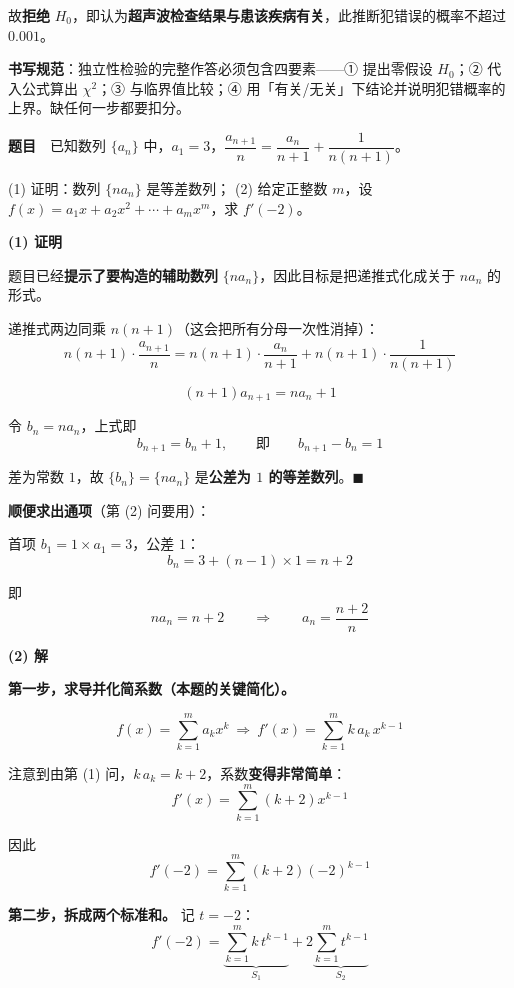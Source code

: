 故\textbf{拒绝} $H_0$，即认为\textbf{超声波检查结果与患该疾病有关}，此推断犯错误的概率不超过 $0.001$。

\begin{gktip}
\textbf{书写规范}：独立性检验的完整作答必须包含四要素——① 提出零假设 $H_0$；② 代入公式算出 $\chi^2$；③ 与临界值比较；④ 用「有关/无关」下结论并说明犯错概率的上界。缺任何一步都要扣分。
\end{gktip}

\par\medskip


\textbf{题目}　已知数列 $\{a_n\}$ 中，$a_1=3$，$\dfrac{a_{n+1}}{n}=\dfrac{a_n}{n+1}+\dfrac{1}{n(n+1)}$。

  (1) 证明：数列 $\{na_n\}$ 是等差数列；
  (2) 给定正整数 $m$，设 $f(x)=a_1x+a_2x^2+\cdots+a_mx^m$，求 $f'(-2)$。

\par\medskip

\textbf{(1) 证明}

题目已经\textbf{提示了要构造的辅助数列} $\{na_n\}$，因此目标是把递推式化成关于 $na_n$ 的形式。

递推式两边同乘 $n(n+1)$（这会把所有分母一次性消掉）：
\[n(n+1)\cdot\frac{a_{n+1}}{n}=n(n+1)\cdot\frac{a_n}{n+1}+n(n+1)\cdot\frac{1}{n(n+1)}\]

\[(n+1)a_{n+1}=na_n+1\]

令 $b_n=na_n$，上式即
\[b_{n+1}=b_n+1,\qquad\text{即}\qquad b_{n+1}-b_n=1\]

差为常数 $1$，故 $\{b_n\}=\{na_n\}$ 是\textbf{公差为 $1$ 的等差数列}。$\blacksquare$

\textbf{顺便求出通项}（第 (2) 问要用）：

首项 $b_1=1\times a_1=3$，公差 $1$：
\[b_n=3+(n-1)\times1=n+2\]

即
\[na_n=n+2\qquad\Longrightarrow\qquad a_n=\frac{n+2}{n}\]

\par\medskip

\textbf{(2) 解}

\textbf{第一步，求导并化简系数（本题的关键简化）。}

\[f(x)=\sum_{k=1}^{m}a_kx^k\ \Longrightarrow\ f'(x)=\sum_{k=1}^{m}k\,a_k\,x^{k-1}\]

注意到由第 (1) 问，$k\,a_k=k+2$，系数\textbf{变得非常简单}：
\[f'(x)=\sum_{k=1}^{m}(k+2)x^{k-1}\]

因此
\[f'(-2)=\sum_{k=1}^{m}(k+2)(-2)^{k-1}\]

\textbf{第二步，拆成两个标准和。} 记 $t=-2$：
\[f'(-2)=\underbrace{\sum_{k=1}^{m}k\,t^{k-1}}_{S_1}+2\underbrace{\sum_{k=1}^{m}t^{k-1}}_{S_2}\]

